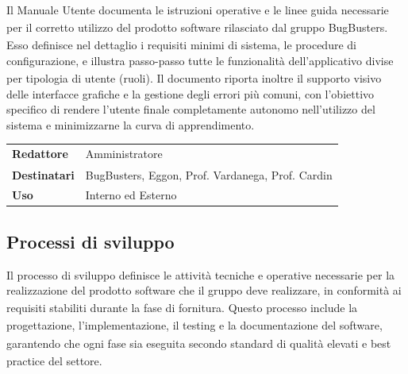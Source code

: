 \documentclass[a4paper,11pt]{article}
\newcommand{\G}{\textsubscript{\scalebox{0.6}{\textbf{G}}}}
\begin{document}
Il Manuale Utente\G{} documenta le istruzioni operative e le linee guida necessarie per il corretto utilizzo del prodotto\G{} software rilasciato dal gruppo BugBusters. Esso definisce nel dettaglio i requisiti minimi di sistema, le procedure di configurazione, e illustra passo-passo tutte le funzionalità\G{} dell'applicativo divise per tipologia di utente (ruoli). Il documento riporta inoltre il supporto visivo delle interfacce grafiche e la gestione degli errori più comuni, con l'obiettivo specifico di rendere l'utente finale completamente autonomo nell'utilizzo del sistema e minimizzarne la curva di apprendimento.

\begin{center}
\begin{tabularx}{\textwidth}{|>{\centering\arraybackslash}p{3.2cm}|>{\centering\arraybackslash}X|}
\hline
\rowcolor{primaryblue!40}
\multicolumn{1}{|>{\centering\arraybackslash}p{3.2cm}|}{\color{white}\textbf{Campo}} & \multicolumn{1}{>{\centering\arraybackslash}X|}{\color{white}\textbf{Dettaglio}} \\
\hline
\textbf{Redattore\G{}} & Amministratore\G{} \\
\hline
\textbf{Destinatari} & BugBusters, Eggon, Prof. Vardanega, Prof. Cardin  \\
\hline
\textbf{Uso} & Interno ed Esterno \\
\hline
\end{tabularx}
\end{center}

\subsection{Processi di sviluppo}
Il processo di sviluppo definisce le attività tecniche e operative necessarie per la realizzazione del prodotto\G{} software che il gruppo deve realizzare,
in conformità ai requisiti\G{} stabiliti durante la fase di fornitura. Questo processo include la progettazione, 
l'implementazione\G{}, il testing e la documentazione del software, garantendo che ogni fase sia eseguita secondo
standard di qualità\G{} elevati e best practice\G{} del settore.
\end{document}
